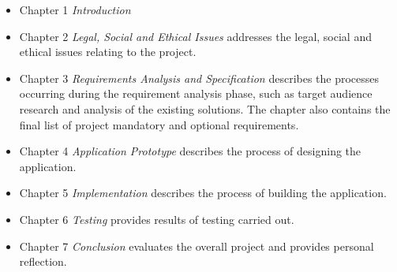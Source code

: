\begin{itemize}
    \item Chapter 1 \emph{Introduction}
    \item Chapter 2 \emph{Legal, Social and Ethical Issues} addresses the legal, social and ethical issues relating to the project.
    \item Chapter 3 \emph{Requirements Analysis and Specification} describes the processes occurring during the requirement analysis phase, such as target audience research and analysis of the existing solutions. The chapter also contains the final list of project mandatory and optional requirements.
    \item Chapter 4 \emph{Application Prototype} describes the process of designing the application.
    \item Chapter 5 \emph{Implementation} describes the process of building the application.
    \item Chapter 6 \emph{Testing} provides results of testing carried out.
    \item Chapter 7 \emph{Conclusion} evaluates the overall project and provides personal reflection.
\end{itemize}


